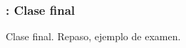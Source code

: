 \documentclass[a4paper,12pt]{article}
\begin{document}
\subsubsection{\martesO: Clase final}
\label{cal:martesO}

Clase final. Repaso, ejemplo de examen.







\end{document}
